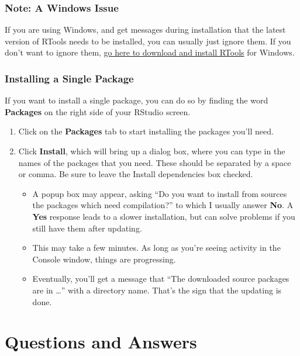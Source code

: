 \documentclass[
]{book}
\providecommand{\tightlist}{%
  \setlength{\itemsep}{0pt}\setlength{\parskip}{0pt}}
\begin{document}
\hypertarget{note-a-windows-issue}{%
\subsection{Note: A Windows Issue}\label{note-a-windows-issue}}

If you are using Windows, and get messages during installation that the latest version of RTools needs to be installed, you can usually just ignore them. If you don't want to ignore them, \href{https://cran.r-project.org/bin/windows/Rtools/}{go here to download and install RTools} for Windows.

\hypertarget{installing-a-single-package}{%
\subsection{Installing a Single Package}\label{installing-a-single-package}}

If you want to install a single package, you can do so by finding the word \textbf{Packages} on the right side of your RStudio screen.

\begin{enumerate}
\def\labelenumi{\arabic{enumi}.}
\tightlist
\item
  Click on the \textbf{Packages} tab to start installing the packages you'll need.
\item
  Click \textbf{Install}, which will bring up a dialog box, where you can type in the names of the packages that you need. These should be separated by a space or comma. Be sure to leave the Install dependencies box checked.

  \begin{itemize}
  \tightlist
  \item
    A popup box may appear, asking ``Do you want to install from sources the packages which need compilation?'' to which I usually answer \textbf{No}. A \textbf{Yes} response leads to a slower installation, but can solve problems if you still have them after updating.
  \item
    This may take a few minutes. As long as you're seeing activity in the Console window, things are progressing.
  \item
    Eventually, you'll get a message that ``The downloaded source packages are in \ldots{}'' with a directory name. That's the sign that the updating is done.
  \end{itemize}
\end{enumerate}

\hypertarget{questions-and-answers}{%
\chapter{Questions and Answers}\label{questions-and-answers}}
\end{document}
